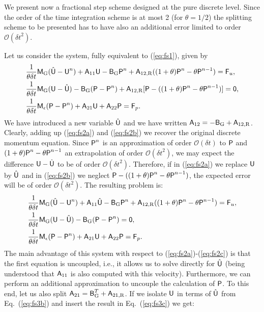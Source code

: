 \documentclass[11pt,a4paper,oneside,reqno]{amsart}
\newcommand{\Eq}[1]{(\ref{eq:#1})}
\def\dt{{\delta t}}
\def\mA{\hbox{{\sffamily A}}}
\def\mB{\hbox{{\sffamily B}}}
\def\mM{\hbox{{\sffamily M}}}
\def\mU{\hbox{{\sffamily U}}}
\def\mP{\hbox{{\sffamily P}}}
\def\mF{\hbox{{\sffamily F}}}
\def\mzero{\hbox{{\sffamily 0}}}
\begin{document}
We present now a fractional step scheme designed at the pure discrete level. Since the order of the time integration scheme is at most 2 (for $\theta = 1/2$) the splitting scheme to be presented has to have also an additional error limited to order $\mathcal{O}(\dt^2)$.

Let us consider the system, fully equivalent to \Eq{fs1}, given by
\begin{align}
& \frac{1}{\theta\dt} \mM_{\rm G} (\hat{\mU} - \mU^n) + \mA_{11}{\mU} 
- \mB_{\rm G} \mP^n + \mA_{12,{\rm R}} ((1+\theta)\mP^n - \theta\mP^{n-1})  = \mF_u, \label{eq:fs2a}\\
&  \frac{1}{\theta\dt} \mM_{\rm G} (\mU - \hat{\mU} ) 
-  \mB_{\rm G} (\mP - \mP^n) + \mA_{12,{\rm R}} [\mP - ((1+\theta)\mP^n - \theta\mP^{n-1})] = \mzero, \label{eq:fs2b}\\
& \frac{1}{\theta\dt} \mM_{\epsilon} ({\mP} - \mP^n) + \mA_{21} \mU + \mA_{22}\mP = \mF_p.\label{eq:fs2c}
\end{align}
We have introduced a new variable $\hat{\mU}$ and we have written $\mA_{12} =  -\mB_{\rm G} + \mA_{12,{\rm R}}$. Clearly, adding up \Eq{fs2a} and \Eq{fs2b} we recover the original discrete momentum equation. Since $\mP^n$ is an approximation of order $\mathcal{O}(\dt)$ to $\mP$ and $(1+\theta)\mP^n - \theta\mP^{n-1}$ an extrapolation of order $\mathcal{O}(\dt^2)$, we may expect the difference $\mU - \hat{\mU}$ to be of order $\mathcal{O}(\dt^2)$. Therefore, if in \Eq{fs2a} we replace $\mU$ by $\hat{\mU}$ and in \Eq{fs2b} we neglect $\mP - ((1+\theta)\mP^n -\theta \mP^{n-1})$, the expected error will be of order $\mathcal{O}(\dt^2)$. The resulting problem is:
\begin{align}
& \frac{1}{\theta\dt} \mM_{\rm G} (\hat{\mU} - \mU^n) + \mA_{11}{\hat{\mU}} 
- \mB_{\rm G} \mP^n + \mA_{12,{\rm R}} ((1+\theta)\mP^n - \theta\mP^{n-1})  = \mF_u, \label{eq:fs3a}\\
&  \frac{1}{\theta\dt} \mM_{\rm G} (\mU - \hat{\mU} ) 
-  \mB_{\rm G} (\mP - \mP^n)  = \mzero, \label{eq:fs3b}\\
&  \frac{1}{\theta\dt} \mM_{\epsilon} ({\mP} - \mP^n) + \mA_{21} \mU + \mA_{22}\mP = \mF_p.\label{eq:fs3c}
\end{align}
The main advantage of this system with respect to \Eq{fs2a}-\Eq{fs2c} is that the first equation is uncoupled, i.e., it allows us to solve directly for $\hat{\mU}$ (being understood that $\mA_{11}$ is also computed with this velocity). Furthermore, we can perform an additional approximation to uncouple the calculation of $\mP$. To this end, let us also split $\mA_{21} = \mB_{\rm G}^T + \mA_{21,{\rm R}}$. If we isolate $\mU$ in terms of $\hat{\mU}$  from Eq.~\Eq{fs3b} and insert the result in Eq.~\Eq{fs3c} we get:
\end{document}
